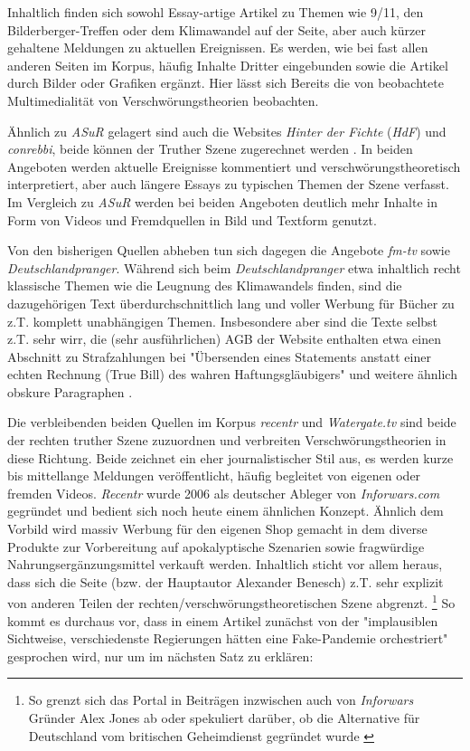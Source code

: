 Inhaltlich finden sich sowohl Essay-artige Artikel zu Themen wie 9/11, den Bilderberger-Treffen oder dem Klimawandel auf der Seite, aber auch kürzer gehaltene Meldungen zu aktuellen Ereignissen.
Es werden, wie bei fast allen anderen Seiten im Korpus, häufig Inhalte Dritter eingebunden sowie die Artikel durch Bilder oder Grafiken ergänzt.
Hier lässt sich Bereits die von \textcite{soukup_2008} beobachtete Multimedialität von Verschwörungstheorien beobachten.

Ähnlich zu \textit{ASuR} gelagert sind auch die Websites \textit{Hinter der Fichte} (\textit{HdF}) und \textit{conrebbi}, beide können der Truther Szene zugerechnet werden \cite[siehe etwa][]{psiram-conrebbi}.
In beiden Angeboten werden aktuelle Ereignisse kommentiert und verschwörungstheoretisch interpretiert, aber auch längere Essays zu typischen Themen der Szene verfasst.
Im Vergleich zu \textit{ASuR} werden bei beiden Angeboten deutlich mehr Inhalte in Form von Videos und Fremdquellen in Bild und Textform genutzt.

Von den bisherigen Quellen abheben tun sich dagegen die Angebote \textit{fm-tv} sowie \textit{Deutschlandpranger}.
Während sich beim \textit{Deutschlandpranger} etwa inhaltlich recht klassische Themen wie die Leugnung des Klimawandels \parencite*[vgl.][]{dprang-klima} finden, sind die dazugehörigen Text überdurchschnittlich lang und voller Werbung für Bücher zu z.T. komplett unabhängigen Themen.
Insbesondere aber sind die Texte selbst z.T. sehr wirr, die (sehr ausführlichen) AGB der Website enthalten etwa einen Abschnitt zu Strafzahlungen bei "Übersenden eines Statements anstatt einer echten Rechnung (True Bill) des wahren Haftungsgläubigers" \parencite*{dprang-agb} und weitere ähnlich obskure Paragraphen .

Die verbleibenden beiden Quellen im Korpus \textit{recentr} und \textit{Watergate.tv} sind beide der rechten truther Szene zuzuordnen und verbreiten Verschwörungstheorien in diese Richtung.
Beide zeichnet ein eher journalistischer Stil aus, es werden kurze bis mittellange Meldungen veröffentlicht, häufig begleitet von eigenen oder fremden Videos.
\textit{Recentr} wurde 2006 als deutscher Ableger von \textit{Inforwars.com} gegründet und bedient sich noch heute einem ähnlichen Konzept.
Ähnlich dem Vorbild wird massiv Werbung für den eigenen Shop gemacht in dem diverse Produkte zur Vorbereitung auf apokalyptische Szenarien sowie fragwürdige Nahrungsergänzungsmittel verkauft werden.
Inhaltlich sticht vor allem heraus, dass sich die Seite (bzw. der Hauptautor Alexander Benesch) z.T. sehr explizit von anderen Teilen der rechten/verschwörungstheoretischen Szene abgrenzt.
\footnote{So grenzt sich das Portal in Beiträgen inzwischen auch von \textit{Inforwars} Gründer Alex Jones ab \parencite*{recentr-jones} oder spekuliert darüber, ob die Alternative für Deutschland vom britischen Geheimdienst gegründet wurde \parencite{recentr-afd}}
So kommt es durchaus vor, dass in einem Artikel zunächst von der "implausiblen Sichtweise, verschiedenste Regierungen hätten eine Fake-Pandemie orchestriert" \parencite{recentr-population} gesprochen wird, nur um im nächsten Satz zu erklären: 

